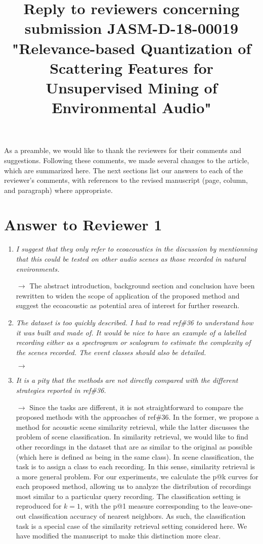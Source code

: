 \documentclass[10pt]{article}
\title{Reply to reviewers concerning submission JASM-D-18-00019 "Relevance-based Quantization of Scattering Features for Unsupervised Mining of Environmental Audio"}
\begin{document}
\maketitle

As a preamble, we would like to thank the reviewers for their comments and suggestions. Following these comments, we made several changes to the article, which are summarized here. The next sections list our answers to each of the reviewer’s comments, with references to the revised manuscript (page, column, and paragraph) where appropriate.

\section{Answer to Reviewer 1}

\begin{enumerate}

\item \emph{I suggest that they only refer to ecoacoustics in the discussion by mentionning that this could be tested on other audio scenes as those recorded in natural environments.}

$\rightarrow$ The abstract introduction, background section and conclusion have been rewritten to widen the scope of application of the proposed method and suggest the ecoacoustic as potential area of interest for further research.

\item \emph{The dataset is too quickly described. I had to read ref\#36 to understand how it was built and made of. It would be nice to have an example of a labelled recording either as a spectrogram or scalogram to estimate the complexity of the scenes recorded. The event classes should also be detailed.}

$\rightarrow$ 

\item \emph{It is a pity that the methods are not directly compared with the different strategies reported in ref\#36.}

$\rightarrow$
Since the tasks are different, it is not straightforward to compare the proposed methods with the approaches of ref\#36. In the former, we propose a method for acoustic scene similarity retrieval, while the latter discusses the problem of scene classification. In similarity retrieval, we would like to find other recordings in the dataset that are as similar to the original as possible (which here is defined as being in the same class). In scene classification, the task is to assign a class to each recording. In this sense, similarity retrieval is a more general problem. For our experiments, we calculate the p@k curves for each proposed method, allowing us to analyze the distribution of recordings most similar to a particular query recording. The classification setting is reproduced for $k = 1$, with the p@1 measure corresponding to the leave-one-out classification accuracy of nearest neighbors. As such, the classification task is a special case of the similarity retrieval setting considered here. We have modified the manuscript to make this distinction more clear.


\end{enumerate}
\end{document}
